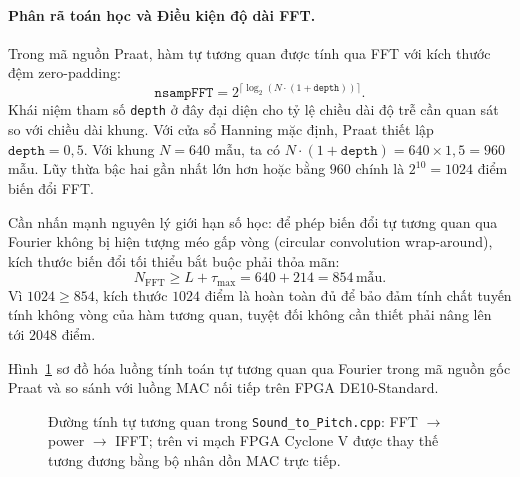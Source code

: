\paragraph{Phân rã toán học và Điều kiện độ dài FFT.}
Trong mã nguồn Praat, hàm tự tương quan được tính qua FFT với kích thước đệm zero-padding:
\[
\texttt{nsampFFT} = 2^{\lceil\log_2(N \cdot (1 + \texttt{depth}))\rceil}.
\]
Khái niệm tham số \texttt{depth} ở đây đại diện cho tỷ lệ chiều dài độ trễ cần quan sát so với chiều dài khung. Với cửa sổ Hanning mặc định, Praat thiết lập $\texttt{depth} = 0{,}5$. Với khung $N = 640$ mẫu, ta có $N \cdot (1 + \texttt{depth}) = 640 \times 1{,}5 = 960$ mẫu. Lũy thừa bậc hai gần nhất lớn hơn hoặc bằng $960$ chính là $2^{10} = 1024$ điểm biến đổi FFT.

Cần nhấn mạnh nguyên lý giới hạn số học: để phép biến đổi tự tương quan qua Fourier không bị hiện tượng méo gấp vòng (circular convolution wrap-around), kích thước biến đổi tối thiểu bắt buộc phải thỏa mãn:
\[
N_{\mathrm{FFT}} \ge L + \tau_{\max} = 640 + 214 = 854\,\text{mẫu}.
\]
Vì $1024 \ge 854$, kích thước $1024$ điểm là hoàn toàn đủ để bảo đảm tính chất tuyến tính không vòng của hàm tương quan, tuyệt đối không cần thiết phải nâng lên tới $2048$ điểm.

Hình~\ref{fig:ch01_acf_path} sơ đồ hóa luồng tính toán tự tương quan qua Fourier trong mã nguồn gốc Praat và so sánh với luồng MAC nối tiếp trên FPGA DE10-Standard.

\begin{figure}[H]
\centering
{}
\caption{Đường tính tự tương quan trong \texttt{Sound\_to\_Pitch.cpp}: FFT $\to$ power $\to$ IFFT; trên vi mạch FPGA Cyclone V được thay thế tương đương bằng bộ nhân dồn MAC trực tiếp.}
\label{fig:ch01_acf_path}
\end{figure}

